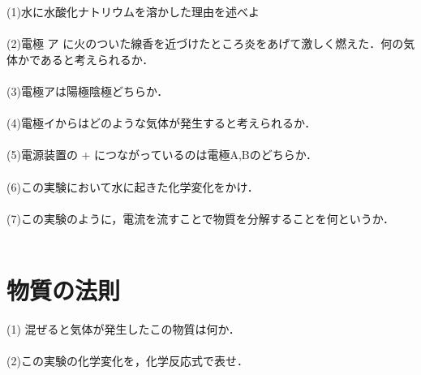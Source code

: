 \documentclass[autodetect-engine,dvi=dvipdfmx,ja=standard,
               a4j,11pt]{bxjsarticle}
\begin{document}
    (1)水に水酸化ナトリウムを溶かした理由を述べよ\\\\

    (2)電極 ア に火のついた線香を近づけたところ炎をあげて激しく燃えた．何の気体かであると考えられるか．\\\\

    (3)電極アは陽極陰極どちらか．\\\\

    (4)電極イからはどのような気体が発生すると考えられるか．\\\\

    (5)電源装置の + につながっているのは電極A,Bのどちらか．\\\\

    (6)この実験において水に起きた化学変化をかけ．\\\\

    (7)この実験のように，電流を流すことで物質を分解することを何というか．\\\\
    \clearpage
\section{物質の法則}
\begin{figure}[htb]
        \centering
        \vspace{20pt} %
        \caption{}
\end{figure}
    (1) 混ぜると気体が発生したこの物質は何か．\\\\

    (2)この実験の化学変化を，化学反応式で表せ．\\\\
\end{document}
